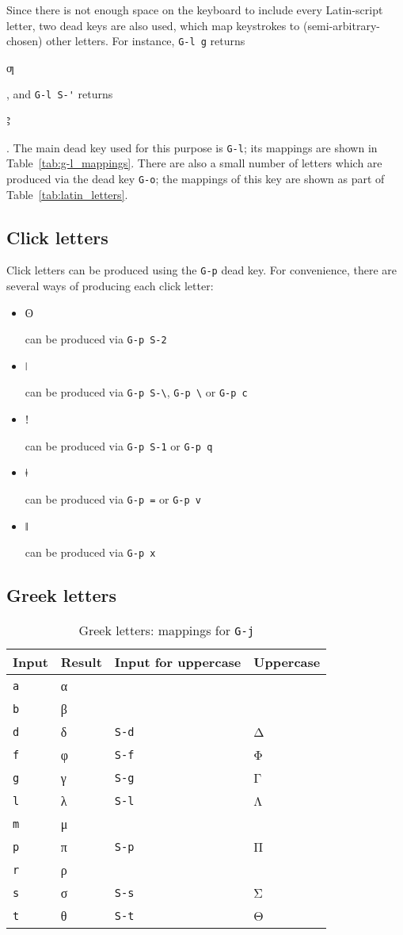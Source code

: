\documentclass[oneside]{memoir}
\newcommand{\key}{\verb}
\newcommand{\keynv}{\texttt}
\newcommand{\out}[1]{\colorbox{gray!20}{\strut{}#1}}
\begin{document}
Since there is not enough space on the keyboard to include every Latin-script letter,
  two dead keys are also used, which map keystrokes to (semi-arbitrary-chosen) other letters.
For instance, \key|G-l g| returns \out{ƣ}, and \key|G-l S-'| returns \out{Ꜣ}.
The main dead key used for this purpose is \key|G-l|;
  its mappings are shown in Table~\ref{tab:g-l_mappings}.
There are also a small number of letters which are produced via the dead key \key|G-o|;
  the mappings of this key are shown as part of Table~\ref{tab:latin_letters}.

\subsection{Click letters}
\label{sec:clicks}

Click letters can be produced using the \key|G-p| dead key.
For convenience, there are several ways of producing each click letter:

\begin{itemize}[noitemsep]
\item \out{ʘ} can be produced via \key|G-p S-2|
\item \out{ǀ} can be produced via \key|G-p S-\|, \key|G-p \| or \key|G-p c|
\item \out{ǃ} can be produced via \key|G-p S-1| or \key|G-p q|
\item \out{ǂ} can be produced via \key|G-p =| or \key|G-p v|
\item \out{ǁ} can be produced via \key|G-p x|
\end{itemize}

\subsection{Greek letters}
\label{sec:greek_letters}

\begin{table}
\centering
\caption{Greek letters: mappings for \keynv{G-j}}
\label{tab:greek_letters}
\begin{tabular}{llll}
\toprule
Input & Result & Input for uppercase & Uppercase \\
\midrule
\key|a| & α & & \\
\key|b| & β & & \\
\key|d| & δ & \key|S-d| & Δ \\
\key|f| & φ & \key|S-f| & Φ \\
\key|g| & γ & \key|S-g| & Γ \\
\key|l| & λ & \key|S-l| & Λ \\
\key|m| & μ & & \\
\key|p| & π & \key|S-p| & Π \\
\key|r| & ρ & & \\
\key|s| & σ & \key|S-s| & Σ \\
\key|t| & θ & \key|S-t| & Θ \\
\bottomrule
\end{tabular}
\end{table}
\end{document}
